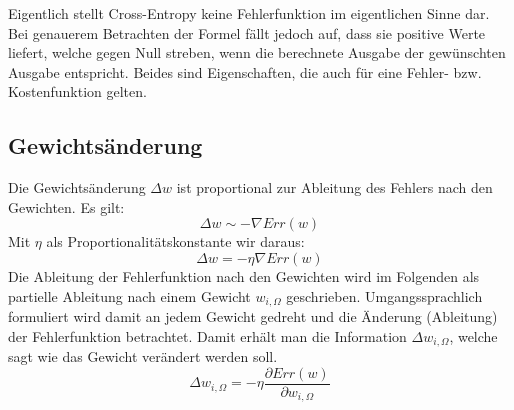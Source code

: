 Eigentlich stellt Cross-Entropy keine Fehlerfunktion im eigentlichen Sinne dar. Bei genauerem Betrachten der Formel fällt jedoch auf, dass sie positive Werte liefert, welche gegen Null streben, wenn die berechnete Ausgabe der gewünschten Ausgabe entspricht. Beides sind Eigenschaften, die auch für eine Fehler- bzw. Kostenfunktion gelten.


\subsection*{Gewichtsänderung}
Die Gewichtsänderung $\Delta w$ ist proportional zur Ableitung des Fehlers nach den Gewichten. Es gilt:
\[
	\Delta w \sim - \nabla Err(w)
\]
Mit $\eta$ als Proportionalitätskonstante wir daraus:
\[
	\Delta w = - \eta \nabla Err(w)
\]
Die Ableitung der Fehlerfunktion nach den Gewichten wird im Folgenden als partielle Ableitung nach einem Gewicht $w_{i,\Omega}$ geschrieben. Umgangssprachlich formuliert wird damit an jedem Gewicht gedreht und die Änderung (Ableitung) der Fehlerfunktion betrachtet. Damit erhält man die Information $\Delta w_{i,\Omega}$, welche sagt wie das Gewicht verändert werden soll.
\[
	\Delta w_{i,\Omega} = - \eta \frac{\partial Err(w)}{\partial w_{i,\Omega}}
\]
